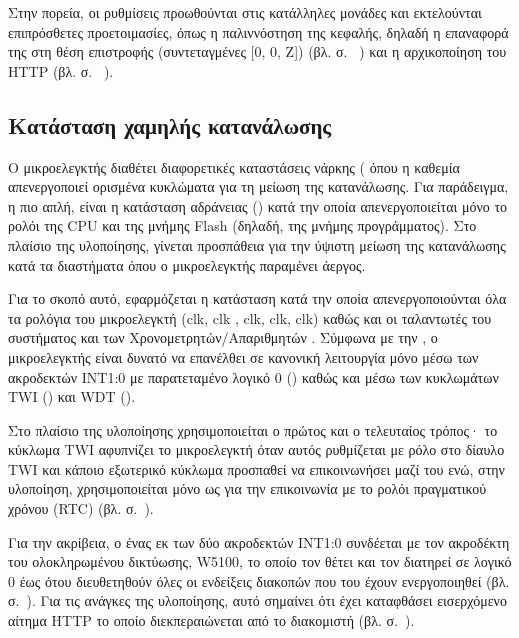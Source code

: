 Στην πορεία, οι ρυθμίσεις προωθούνται στις κατάλληλες μονάδες και εκτελούνται
επιπρόσθετες προετοιμασίες, όπως η παλιννόστηση της κεφαλής, δηλαδή η επαναφορά
της στη θέση επιστροφής (συντεταγμένες [0, 0, Z]) (βλ. σ.~%
\pageref{sec:motor:homing}) και η αρχικοποίηση του HTTP  (βλ. σ.~%
\pageref{ssubsec:network:port_mr}).


\subsection{Κατάσταση χαμηλής κατανάλωσης}

Ο μικροελεγκτής διαθέτει διαφορετικές καταστάσεις νάρκης (
όπου η καθεμία απενεργοποιεί ορισμένα κυκλώματα για τη μείωση της κατανάλωσης.
Για παράδειγμα, η πιο απλή, είναι η κατάσταση αδράνειας () κατά την
οποία απενεργοποιείται μόνο το ρολόι της CPU και της μνήμης Flash (δηλαδή, της
μνήμης προγράμματος). Στο πλαίσιο της υλοποίησης, γίνεται προσπάθεια για την
ύψιστη μείωση της κατανάλωσης κατά τα διαστήματα όπου ο μικροελεγκτής παραμένει
άεργος.

Για το σκοπό αυτό, εφαρμόζεται η κατάσταση  κατά την οποία
απενεργοποιούνται όλα τα ρολόγια του μικροελεγκτή (clk, clk%
, clk, clk, clk) καθώς και οι
ταλαντωτές του συστήματος και των Χρονομετρητών\slash{}Απαριθμητών \parencite%
[38]{atmel13}. Σύμφωνα με την \textcite[38]{atmel13}, ο μικροελεγκτής είναι
δυνατό να επανέλθει σε κανονική λειτουργία μόνο μέσω των ακροδεκτών INT1:0 με
παρατεταμένο λογικό 0 () καθώς και μέσω των κυκλωμάτων
TWI () και WDT ().

Στο πλαίσιο της υλοποίησης χρησιμοποιείται ο πρώτος και ο τελευταίος τρόπος· το
κύκλωμα TWI αφυπνίζει το μικροελεγκτή όταν αυτός ρυθμίζεται με ρόλο 
στο δίαυλο TWI και κάποιο εξωτερικό κύκλωμα προσπαθεί να επικοινωνήσει μαζί του
ενώ, στην υλοποίηση, χρησιμοποιείται μόνο ως  για την επικοινωνία με
το ρολόι πραγματικού χρόνου (RTC) (βλ.  σ.~\pageref{sec:rtc}).

Για την ακρίβεια, ο ένας εκ των δύο ακροδεκτών INT1:0 συνδέεται με τον ακροδέκτη
 του ολοκληρωμένου δικτύωσης, W5100, το οποίο τον θέτει και τον
διατηρεί σε λογικό 0 έως ότου διευθετηθούν όλες οι ενδείξεις διακοπών που του
έχουν ενεργοποιηθεί
(βλ.  σ.~\pageref{subsec:network:interface}).
Για τις ανάγκες της υλοποίησης, αυτό σημαίνει ότι έχει καταφθάσει εισερχόμενο
αίτημα HTTP το οποίο διεκπεραιώνεται από το διακομιστή (βλ.
 σ.~\pageref{sec:http-server}).

